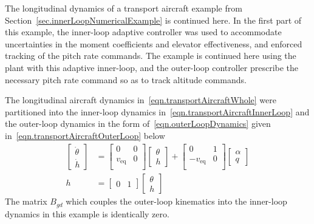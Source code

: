 The longitudinal dynamics of a transport aircraft example from Section~\ref{sec.innerLoopNumericalExample} is continued here.
In the first part of this example, the inner-loop adaptive controller was used to accommodate uncertainties in the moment coefficients and elevator effectiveness, and enforced tracking of the pitch rate commands.
The example is continued here using the plant with this adaptive inner-loop, and the outer-loop controller prescribe the necessary pitch rate command so as to track altitude commands.

The longitudinal aircraft dynamics in\ \eqref{eqn.transportAircraftWhole} were partitioned into the inner-loop dynamics in\ \eqref{eqn.transportAircraftInnerLoop} and the outer-loop dynamics in the form of\ \eqref{eqn.outerLoopDynamics} given in\ \eqref{eqn.transportAircraftOuterLoop} below
\begin{equation}
  \label{eqn.transportAircraftOuterLoop}
  \begin{split}
    \begin{bmatrix}
      \dot{\theta} \\
      \dot{h}
    \end{bmatrix}
    &=
    \begin{bmatrix}
      0 & 0 \\
      v_{\text{eq}} & 0 \\
    \end{bmatrix}
    \begin{bmatrix}
      \theta \\
      h
    \end{bmatrix}
    +
    \begin{bmatrix}
      0 & 1 \\
      -v_{\text{eq}} & 0 \\
    \end{bmatrix}
    \begin{bmatrix}
      \alpha \\
      q
    \end{bmatrix} \\
    h
    &=
    \begin{bmatrix}
      0 & 1
    \end{bmatrix}
    \begin{bmatrix}
    \theta \\
    h
    \end{bmatrix}
  \end{split}
\end{equation}
The matrix $B_{gd}$ which couples the outer-loop kinematics into the inner-loop dynamics in this example is identically zero.
